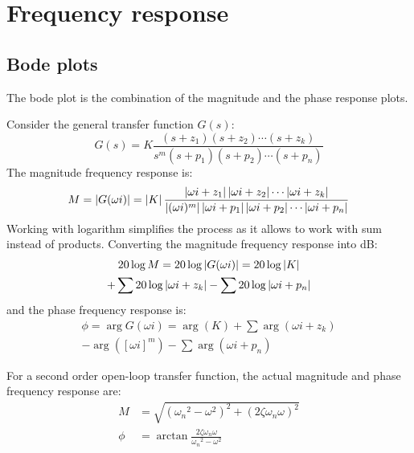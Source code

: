 \documentclass[10pt, twocolumn]{article}
\begin{document}
\section{Frequency response}
\subsection{Bode plots}
The bode plot is the combination of the magnitude and the phase response plots.

Consider the general transfer function \(G(s)\):
\[
  G(s) = K\frac{(s + z_1) (s + z_2) \cdots (s + z_k)}{s^m (s + p_1) (s + p_2) \cdots (s + p_n)}
\]
The magnitude frequency response is:
\[
  M = \left| G(\omega i) \right| = \left| K \right|\frac{\left| \omega i + z_1 \right| \left| \omega i + z_2 \right|\cdots \left| \omega i + z_k \right|}{\left| (\omega i)^m \right| \left| \omega i + p_1 \right| \left| \omega i + p_2 \right| \cdots \left| \omega i + p_n \right|}
\]
Working with logarithm simplifies the process as it allows to work with sum instead of products.
Converting the magnitude frequency response into \si{\deci\bel}:
\begin{multline*}
  20\log{M} = 20\log{\left| G(\omega i) \right|} = 20\log{\left| K \right|} \\
  + \sum{20\log{\left| \omega i + z_k \right|}} - \sum{20\log{\left| \omega i + p_n \right|}}
\end{multline*}
and the phase frequency response is:
\begin{multline*}
  \phi = \arg{G(\omega i)} = \arg(K) + \sum{\arg(\omega i + z_k)} \\
  - \arg([\omega i]^m) - \sum{\arg(\omega i + p_n)}
\end{multline*}

For a second order open-loop transfer function, the actual magnitude and phase frequency response are:
\begin{align*}
  M    & = \sqrt{({\omega_n}^2 - \omega^2)^2 + (2\zeta \omega_n\omega)^2} \\
  \phi & = \arctan\frac{2\zeta \omega_n\omega}{{\omega_n}^2 - \omega^2}
\end{align*}
\end{document}
